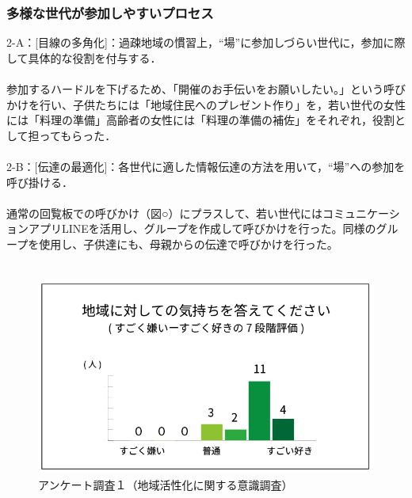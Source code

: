 \documentclass[a4paper]{jsarticle}
\begin{document}
\subsubsection{多様な世代が参加しやすいプロセス}
2-A：[目線の多角化]：過疎地域の慣習上，“場”に参加しづらい世代に，参加に際して具体的な役割を付与する．\\\\
参加するハードルを下げるため、「開催のお手伝いをお願いしたい。」という呼びかけを行い、子供たちには「地域住民へのプレゼント作り」を，若い世代の女性には「料理の準備」高齢者の女性には「料理の準備の補佐」をそれぞれ，役割として担ってもらった．\\\\

2-B：[伝達の最適化]：各世代に適した情報伝達の方法を用いて，“場”への参加を呼び掛ける．\\\\
通常の回覧板での呼びかけ（図○）にプラスして、若い世代にはコミュニケーションアプリLINEを活用し、グループを作成して呼びかけを行った。同様のグループを使用し、子供達にも、母親からの伝達で呼びかけを行った。\\\\
\begin{figure}[h]
  \begin{center}
    \includegraphics[width=0.95\hsize]{./images/03}
    \caption{アンケート調査１（地域活性化に関する意識調査）}
    \label{fig:tmu_hino}
  \end{center}
\end{figure}
\end{document}
